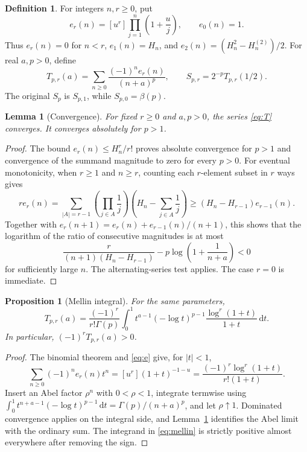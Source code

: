 \documentclass[11pt]{article}
\numberwithin{equation}{section}
\newtheorem{lemma}[theorem]{Lemma}
\newtheorem{proposition}[theorem]{Proposition}
\theoremstyle{definition}\newtheorem{definition}[theorem]{Definition}
\theoremstyle{remark}\newtheorem{remark}[theorem]{Remark}
\newcommand{\dd}{\,\mathrm d}
\begin{document}
\begin{definition}
For integers $n,r\ge0$, put
\begin{equation}\label{eq:e}
 e_r(n)=[u^r]\prod_{j=1}^n\left(1+\frac uj\right),
 \qquad e_0(n)=1.
\end{equation}
Thus $e_r(n)=0$ for $n<r$, $e_1(n)=H_n$, and
$e_2(n)=(H_n^2-H_n^{(2)})/2$. For real $a,p>0$, define
\begin{equation}\label{eq:T}
 T_{p,r}(a)=\sum_{n\ge0}\frac{(-1)^n e_r(n)}{(n+a)^p},
 \qquad S_{p,r}=2^{-p}T_{p,r}(1/2).
\end{equation}
The original $S_p$ is $S_{p,1}$, while $S_{p,0}=\beta(p)$.
\end{definition}

\begin{lemma}[Convergence]\label{lem:conv}
For fixed $r\ge0$ and $a,p>0$, the series \eqref{eq:T} converges. It converges absolutely for $p>1$.
\end{lemma}
\begin{proof}
The bound $e_r(n)\le H_n^r/r!$ proves absolute convergence for $p>1$ and convergence of the summand magnitude to zero for every $p>0$. For eventual monotonicity, when $r\ge1$ and $n\ge r$, counting each $r$-element subset in $r$ ways gives
\[
 r e_r(n)=\sum_{|A|=r-1}\left(\prod_{j\in A}\frac1j\right)
              \left(H_n-\sum_{j\in A}\frac1j\right)
 \ge (H_n-H_{r-1})e_{r-1}(n).
\]
Together with $e_r(n+1)=e_r(n)+e_{r-1}(n)/(n+1)$, this shows that the logarithm of the ratio of consecutive magnitudes is at most
\[
 \frac{r}{(n+1)(H_n-H_{r-1})}
 -p\log\left(1+\frac1{n+a}\right)<0
\]
for sufficiently large $n$. The alternating-series test applies. The case $r=0$ is immediate.
\end{proof}

\begin{proposition}[Mellin integral]\label{prop:integral}
For the same parameters,
\begin{equation}\label{eq:mellin}
 T_{p,r}(a)=\frac{(-1)^r}{r!\Gamma(p)}
 \int_0^1 t^{a-1}(-\log t)^{p-1}
             \frac{\log^r(1+t)}{1+t}\dd t.
\end{equation}
In particular, $(-1)^r T_{p,r}(a)>0$.
\end{proposition}
\begin{proof}
The binomial theorem and \eqref{eq:e} give, for $|t|<1$,
\begin{equation}\label{eq:hgen}
 \sum_{n\ge0}(-1)^ne_r(n)t^n
  =[u^r](1+t)^{-1-u}
  =\frac{(-1)^r\log^r(1+t)}{r!(1+t)}.
\end{equation}
Insert an Abel factor $\rho^n$ with $0<\rho<1$, integrate termwise using
$\int_0^1 t^{n+a-1}(-\log t)^{p-1}\dd t=\Gamma(p)/(n+a)^p$, and let $\rho\uparrow1$. Dominated convergence applies on the integral side, and Lemma~\ref{lem:conv} identifies the Abel limit with the ordinary sum. The integrand in \eqref{eq:mellin} is strictly positive almost everywhere after removing the sign.
\end{proof}
\end{document}
